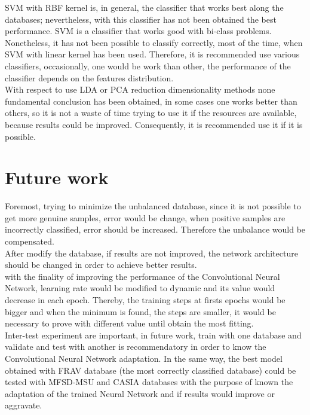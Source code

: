 SVM with RBF kernel is, in general, the classifier that works best along the databases; nevertheless, with this classifier has not been obtained the best performance. SVM is a classifier that works good with bi-class problems. Nonetheless, it has not been possible to classify correctly, most of the time, when SVM with linear kernel has been used. Therefore, it is recommended use various classifiers, occasionally, one would be work than other, the performance of the classifier depends on the features distribution.\\


With respect to use LDA or PCA reduction dimensionality methods none fundamental conclusion has been obtained, in some cases one works better than others, so it is not a waste of time trying to use it if the resources are available, because results could be improved. Consequently, it is recommended use it if it is possible.\\


\section{Future work}
Foremost, trying to minimize the unbalanced database, since it is not possible to get more genuine samples, error would be change, when positive samples are incorrectly classified, error should be increased. Therefore the unbalance would be compensated.\\

After modify the database, if results are not improved, the network architecture should be changed in order to achieve better results.\\

with the finality of improving the performance of the Convolutional Neural Network, learning rate would be modified to dynamic and its value would decrease in each epoch. Thereby, the training steps at firsts epochs would be bigger and when the minimum is found, the steps are smaller, it would be necessary to prove with different value until obtain the most fitting.\\

Inter-test experiment are important, in future work, train with one database and validate and test with another is recommendatory in order to know the Convolutional Neural Network adaptation. In the same way, the best model obtained with FRAV database (the most correctly classified database) could be tested with MFSD-MSU and CASIA databases with the purpose of known the adaptation of the trained Neural Network and if results would improve or aggravate.\\

